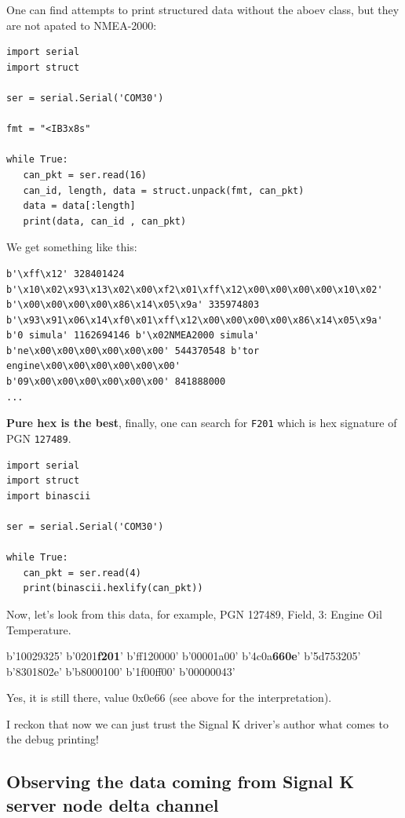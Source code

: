 \documentclass[11pt]{article}
\begin{document}
    One can find attempts to print structured data without the aboev class,
but they are not apated to NMEA-2000:

    \begin{verbatim}
import serial
import struct

ser = serial.Serial('COM30')

fmt = "<IB3x8s"

while True:
   can_pkt = ser.read(16)
   can_id, length, data = struct.unpack(fmt, can_pkt)
   data = data[:length]
   print(data, can_id , can_pkt)
\end{verbatim}

    We get something like this:

\begin{verbatim}
b'\xff\x12' 328401424 b'\x10\x02\x93\x13\x02\x00\xf2\x01\xff\x12\x00\x00\x00\x00\x10\x02'
b'\x00\x00\x00\x00\x86\x14\x05\x9a' 335974803 b'\x93\x91\x06\x14\xf0\x01\xff\x12\x00\x00\x00\x00\x86\x14\x05\x9a'
b'0 simula' 1162694146 b'\x02NMEA2000 simula'
b'ne\x00\x00\x00\x00\x00\x00' 544370548 b'tor engine\x00\x00\x00\x00\x00\x00'
b'09\x00\x00\x00\x00\x00\x00' 841888000
...
\end{verbatim}

    \textbf{Pure hex is the best}, finally, one can search for \texttt{F201}
which is hex signature of PGN \texttt{127489}.

    \begin{verbatim}
import serial
import struct
import binascii

ser = serial.Serial('COM30')

while True:
   can_pkt = ser.read(4)
   print(binascii.hexlify(can_pkt))
\end{verbatim}

    Now, let's look from this data, for example, PGN 127489, Field, 3:
Engine Oil Temperature.

    b'10029325' b'0201\textbf{f201}' b'ff120000' b'00001a00'
b'4c0a\textbf{660e}' b'5d753205' b'8301802e' b'b8000100' b'1f00ff00'
b'00000043'

    Yes, it is still there, value 0x0e66 (see above for the interpretation).

    I reckon that now we can just trust the Signal K driver's author what
comes to the debug printing!

    \hypertarget{observing-the-data-coming-from-signal-k-server-node-delta-channel}{%
\subsection{Observing the data coming from Signal K server node delta
channel}\label{observing-the-data-coming-from-signal-k-server-node-delta-channel}}
\end{document}
